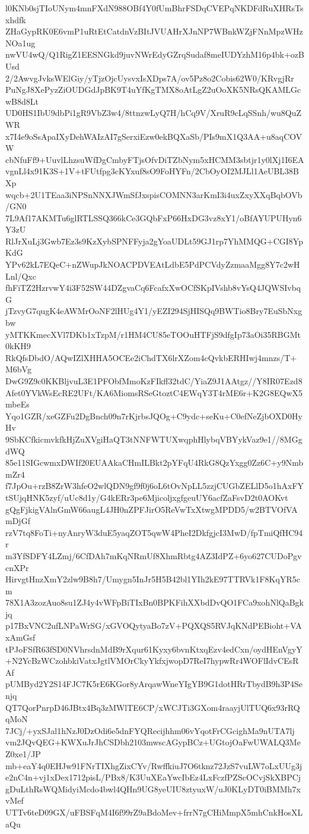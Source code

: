 l0KNb0sjTIoUNym4mnFXdN988OBf4Y0fUmBhrFSDqCVEPqNKDFdRuXHRsTsxhdfk
ZHaGypRK0E6vmP1uRtEtCatdnVzBItJVUAHrXJnNP7WBnkWZjFNnMpzWHzNOa1ug
nwVU4wQ/Q1RigZ1EESNGkd9juvNWrEdyGZrqSudaf8meIUDYzhM16p4bk+ozBUsd
2/2AwvgJvksWElGiy/yTjzOjcUysvxIsXDps7A/ov5Pz8o2Cobis62W0/KRvgjRr
PuNgJ8XePyzZiOUDGdJpBK9T4uYfKgTMX8oAtLgZ2uOoXK5NRsQKAMLGcwB8d8Lt
UD0HS1IbU9dbPi1gR9VbZ3w4/8ttnzwLyQ7H/hCq9V/XruR9cLqSSnh/wu8QuZWR
x7I4e9oSsApaIXyDehWAIzAI7gSerxiEzw0ekBQXaSb/PIs9mX1Q3AA+u8aqCOVW
cbNfuFf9+UuvlLhzsuWfDgCmbyFTjsOfvDiTZbNym5xHCMM3sbtjr1y0lXj1I6EA
vgnLl4x91K3S+1V+tFUtfpg3cKYxuf8sO9FoHYFn/2CbOyOI2MJLl1AeUBL38BXp
wqcb+2U1TEaa3iNPSnNNXJWmSfJxspisCOMNN3arKmI3i4uxZxyXXqBqbOVb/GN0
7L9Af17AKMTu6glRTLSSQ366kCe3GQbFxP66HxDG3vz8xY1/oBfAYUPUHyn6Y3zU
RlJrXuLj3Gwb7Ez3s9KzXybSPNFFyja2gYoaUDLt59GJ1rp7YhMMQG+CGI8YpKdG
YPv62kL7EQeC+nZWupJkNOACPDVEAtLdbE5PdPCVdyZzmaaMgg8Y7c2wHLnl/Qxc
fhFiTZ2HzrvwY4i3F52SW44DZgvaCq6FcafxXwOCfSKpIVshb8vYsQ4JQWSIvbqG
jTzvyG7qugK4eAWMrOoNF2lHUg4Y1/yEZI294SjHISQq9BWTio8Bry7EuSbNxgbw
yMTKKmecXVl7DKb1xTzpM/r1HM4CU85eTOOuHTFjS9dfgIp73aOi35RBGMt0kKH9
RkQfsDbdO/AQwIZlXHHA5OCEe2iChdTX6lrXZom4cQvkbERHIwj4mnzs/T+M6bVg
DwG9Z9c0KKBljvuL3E1PFObfMmoKzFIkff32tdC/YiaZ9J1AAtgz//Y8IR07Ezd8
Afet0YVkWsEcRE2UFt/KA6MiomsRSeGtoztC4EWqY3T4rME6r+K2G8EQwX5mbeEs
Yqo1GZR/xeGZFu2DgBnch09n7rKjrbsJQOg+C9ydc+seKu+C0efNeZjbOXD0HyHv
9SbKCfkicmvkfkHjZuXVgiHaQT3tNNFWTUXwqphHlybqVBYykVaz9e1//8MGgdWQ
85e11SIGcwmxDWIf20EUAAkaCHmILBkt2pYFqU4RkG8QzYxgg0Zz6C+y9NmbmZr4
f7JpOu+rzB8ZrW3hfeO2wlQDN9gf9f0j6oL6tOvNpLL5zzjCUGbZELlD5o1hAxFY
tSUjqHNK5zyf/uUc8d1y/G4kERr3pe6MjicoljxgfgeuUY6acfZaFsvD2t0AOKvt
gQgFjkigVAlnGmW66augL4JH0nZPFJirO5ReVwTxXtwgMPDD5/w2BTVOfVAmDjGf
rzV7tq8FoTi+nyAnryW3duE5yaqZOT5qwW4PheI2DkfgjcI3MwD/fpTmiQfHC94r
m3YfSDFY4LZmj/6CfDAh7mKqNRmUf8XhmRbtg4AZ3IdPZ+6yo627CUDoPgvcnXPr
HirvgtHnzXmY2zlw9B8h7/Umygn5InJr5H5B42bl1YIh2kE97TTRVk1F8KqYR5cm
78X1A3zozAuo8su1ZJ4y4vWFpBiTIxBn0BPKFihXXbdDvQO1FCa9xohNlQaBgkjq
p17BxVNC2ufLNPaWrSG/xGVOQytyaBo7zV+PQXQS5RVJqKNdPEBioht+VAxAmGsf
tPJoFSfR63fSD0NVhrsdnMdB9rXqur61Kyxy6bvnKtxqEzv4edCxn/oydHEnVgyY
+N2YcBzWCzohbkiVatxJgtlVMOrCkyYkfxjwopD7ReI7hypwRr4WOFlIdvCEsRAf
pUMByd2Y2S14FJC7K5rE6KGor8yArqawWneYIgYB9G1dotHRrTbydB9h3P4Senjq
QT7QorPnrpD46JBtx4Bq3zMWlTE6CP/xWCJTi3GXom4raayjUlTUQ6x93rRQqMoN
7JCj/+yxSJal1hNzJ0DzOdi6e5dnFYQRecijhhm06vYqotFrCGcighMa9nUTA7lj
vm2JQvQEG+KWXuJrJhCSDbh2103mwscAGypBCz+UGtojOaFwUWALQ3MeZ0xe1/JP
mb+eaY4q0EHJw91FNrTIXhgZixCYv/RwffkiuJ7O6tknz72JzS7vuLW7oLxUUg3j
e2nC4n+vj1xDex1712pisL/PBx8/K3UuXEaYwcIbEz4LxFczfPZScOCvjSkXBPCj
gDuLthRsWQMidyiMcdo4bwl4QHn9UG8yeUIU8ztyuxW/uJ0KLyDT0iBMMh7xvMef
UTTv6teD09GX/uFBSFqM4I6f99rZ9aBdoMev+frrN7gCHiMmpX5mhCnkHosXLaQu
